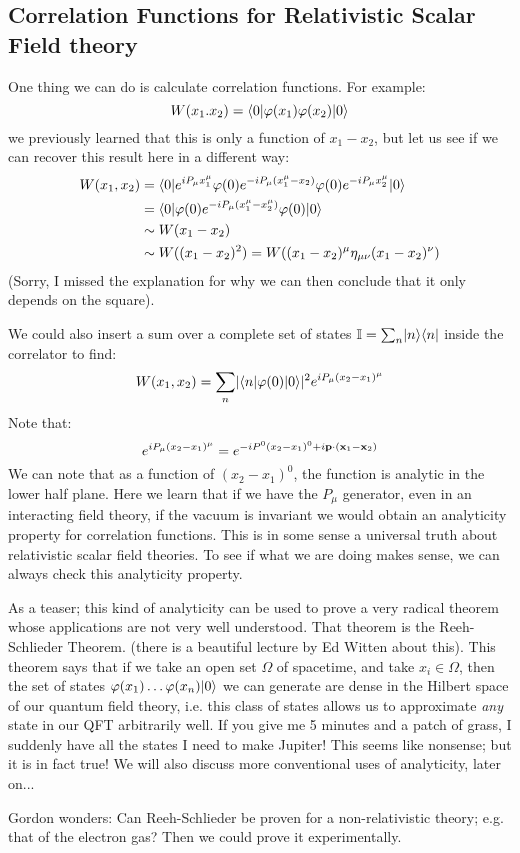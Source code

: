 \subsection{Correlation Functions for Relativistic Scalar Field theory}
One thing we can do is calculate correlation functions. For example:
\begin{equation}
    W(x_1. x_2) = \bra{0}\varphi(x_1)\varphi(x_2)\ket{0}
\end{equation}
we previously learned that this is only a function of $x_1 - x_2$, but let us see if we can recover this result here in a different way:
\begin{equation}
    \begin{split}
        W(x_1, x_2) &= \bra{0}e^{iP_\mu x_1^\mu} \varphi(0)e^{-iP_\mu (x_1^\mu - x_2)} \varphi(0)e^{-iP_\mu x_2^\mu}\ket{0}
    \\ &= \bra{0} \varphi(0)e^{-iP_\mu (x_1^\mu - x_2^\mu)} \varphi(0)\ket{0}
    \\ &\sim W(x_1 - x_2)
    \\ &\sim W((x_1 - x_2)^2) = W((x_1 - x_2)^\mu \eta_{\mu\nu}(x_1 - x_2)^\nu)
    \end{split}
\end{equation}
(Sorry, I missed the explanation for why we can then conclude that it only depends on the square).

We could also insert a sum over a complete set of states $\mathbb{I} = \sum_n \lvert n \rangle \langle n \rvert$ inside the correlator to find:
\begin{equation}
    W(x_1, x_2) = \sum_n \abs{\bra{n}\varphi(0)\ket{0}}^2 e^{iP_\mu (x_2 - x_1)^\mu}
\end{equation}
Note that:
\begin{equation}
    e^{iP_\mu (x_2 - x_1)^\mu} = e^{-iP^0(x_2 - x_1)^0 + i\mathbf{p} \cdot (\mathbf{x}_1 - \mathbf{x}_2)}
\end{equation}
We can note that as a function of $(x_2 - x_1)^0$, the function is analytic in the lower half plane. Here we learn that if we have the $P_\mu$ generator, even in an interacting field theory, if the vacuum is invariant we would obtain an analyticity property for correlation functions. This is in some sense a universal truth about relativistic scalar field theories. To see if what we are doing makes sense, we can always check this analyticity property.

As a teaser; this kind of analyticity can be used to prove a very radical theorem whose applications are not very well understood. That theorem is the Reeh-Schlieder Theorem. (there is a beautiful lecture by Ed Witten about this). This theorem says that if we take an open set $\Omega$ of spacetime, and take $x_i \in \Omega$, then the set of states $\varphi(x_1)\ldots \varphi(x_n)\ket{0}$ we can generate are dense in the Hilbert space of our quantum field theory, i.e. this class of states allows us to approximate \emph{any} state in our QFT arbitrarily well. If you give me 5 minutes and a patch of grass, I suddenly have all the states I need to make Jupiter! This seems like nonsense; but it is in fact true! We will also discuss more conventional uses of analyticity, later on...

Gordon wonders: Can Reeh-Schlieder be proven for a non-relativistic theory; e.g. that of the electron gas? Then we could prove it experimentally.

